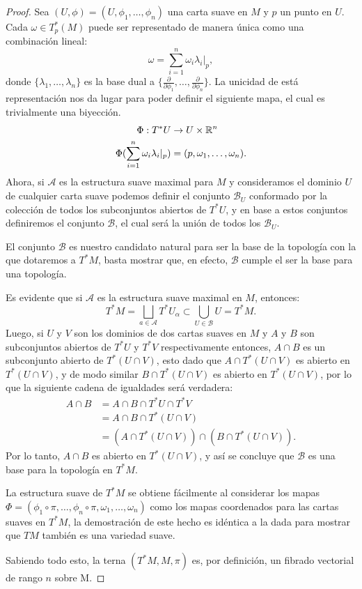 \begin{proof}
	Sea $(U,\phi) = (U,\phi_1, \ldots, \phi_n)$ una carta suave en $M$ y $p$ un punto en $U$. Cada $\omega \in T_{p}^{*}(M)$ puede ser representado de manera única como una combinación lineal:
	\[
		\omega = \sum_{i=1}^{n} \omega_i \lambda_i |_p,
	\]
	donde $\{\lambda_1, \ldots, \lambda_n \}$ es la base dual a $\{\frac{\partial}{\partial \phi_1}, \ldots, \frac{\partial}{\partial \phi_n}\}$. La unicidad de está representación nos da lugar para poder definir el siguiente mapa, el cual es trivialmente una biyección.
	\begin{align*}
		\Phi: T^*U                                   & \to U \times \mathbb{R}^n \\
		\Phi( \sum_{i=1}^{n} \omega_i \lambda_i |_p) & =
		(p, \omega_1, \ldots, \omega_n).
	\end{align*}
	Ahora, si $\mathcal{A}$ es la estructura suave maximal para $M$ y consideramos el dominio $U$ de cualquier carta suave podemos definir el conjunto $\mathcal{B}_U$ conformado por la colección de todos los subconjuntos abiertos de $T^{*}U$, y en base a estos conjuntos definiremos el conjunto $\mathcal{B}$, el cual será la unión de todos los $\mathcal{B}_U$.

	El conjunto $\mathcal{B}$ es nuestro candidato natural para ser la base de la topología con la que dotaremos a $T^{*}M$, basta mostrar que, en efecto, $\mathcal{B}$ cumple el ser la base para una topología.

	Es evidente que si $\mathcal{A}$ es la estructura suave maximal en $M$, entonces:
	\[
    T^{*}M = \bigsqcup_{a \in \mathcal{A}} T^{*}U_{\alpha}
    \subset \bigcup_{U \in \mathcal{B}} U = T^*M.
	\]
	Luego, si $U$ y $V$ son los dominios de dos cartas suaves en $M$ y $A$ y $B$ son subconjuntos abiertos de $T^{*}U$ y $T^{*}V$ respectivamente entonces, $A \cap B$ es un subconjunto abierto de $T^{*}(U \cap V)$, esto dado que $A \cap T^{*}(U \cap V)$ es abierto en $T^{*}(U \cap V)$, y de modo similar $B \cap T^{*}(U \cap V)$ es abierto en $T^{*}(U \cap V)$, por lo que la siguiente cadena de igualdades será verdadera:
	\begin{align*}
		A \cap B & = A \cap B \cap T^{*}U \cap T^{*}V                       \\
		         & = A \cap B \cap T^{*}(U \cap V)                          \\
		         & = (A \cap T^{*}(U \cap V)) \cap (B \cap T^{*}(U \cap V)).
	\end{align*}
  Por lo tanto, $A \cap B$ es abierto en $T^{*}(U \cap V)$, y así se concluye que $\mathcal{B}$ es una base para la topología en $T^{*}M$.

  La estructura suave de $T^{*}M$ se obtiene fácilmente al considerar los mapas $\Phi = (\phi_1 \circ \pi, \ldots, \phi_n \circ \pi, \omega_1, \ldots, \omega_n)$ como los mapas coordenados para las cartas suaves en $T^{*}M$, la demostración de este hecho es idéntica a la dada para mostrar que $TM$ también es una variedad suave.

  Sabiendo todo esto, la terna $(T^{*}M, M, \pi)$ es, por definición, un fibrado vectorial de rango $n$ sobre M.
\end{proof}

